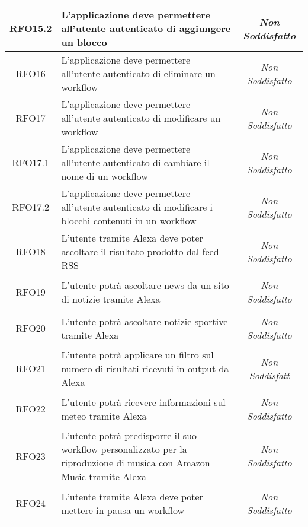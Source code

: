 \begin{longtable}{|c|>{\centering}m{7cm}|c|}
	\hypertarget{RFO15.2}{RFO15.2} & L'applicazione deve permettere all'utente autenticato di aggiungere un blocco & \textit{Non Soddisfatto}\\ \hline
	
	\hypertarget{RFO16}{RFO16} & L'applicazione deve permettere all'utente autenticato di eliminare un workflow & \textit{Non Soddisfatto}\\ \hline
	
	\hypertarget{RFO17}{RFO17} & L'applicazione deve permettere all'utente autenticato di modificare un workflow & \textit{Non Soddisfatto}\\ \hline
	
	\hypertarget{RFO17.1}{RFO17.1} & L'applicazione deve permettere all'utente autenticato di cambiare il nome di un workflow & \textit{Non Soddisfatto}\\ \hline
	
	\hypertarget{RFO17.2}{RFO17.2} & L'applicazione deve permettere all'utente autenticato di modificare i blocchi contenuti in un workflow & \textit{Non Soddisfatto}\\ \hline
	
	\hypertarget{RFO18}{RFO18} & L'utente tramite Alexa deve poter ascoltare il risultato prodotto dal feed RSS & \textit{Non Soddisfatto}\\ \hline
	
	\hypertarget{RFO19}{RFO19} & L'utente potrà ascoltare news da un sito di notizie tramite Alexa & \textit{Non Soddisfatto}\\ \hline
	
	\hypertarget{RFO20}{RFO20} & L'utente potrà ascoltare notizie sportive tramite Alexa & \textit{Non Soddisfatto}\\ \hline
	
	\hypertarget{RFO21}{RFO21} & L'utente potrà applicare un filtro sul numero di risultati ricevuti in output da Alexa & \textit{Non Soddisfatt}\\ \hline
	
	\hypertarget{RFO22}{RFO22} & L'utente potrà ricevere informazioni sul meteo tramite Alexa & \textit{Non Soddisfatto}\\ \hline
	
	\hypertarget{RFO23}{RFO23} & L'utente potrà predisporre il suo workflow personalizzato per la riproduzione di musica con Amazon Music tramite Alexa & \textit{Non Soddisfatto}\\ \hline
	
	\hypertarget{RFO24}{RFO24} & L'utente tramite Alexa deve poter mettere in pausa un workflow & \textit{Non Soddisfatto}\\ \hline
	

\end{longtable}
